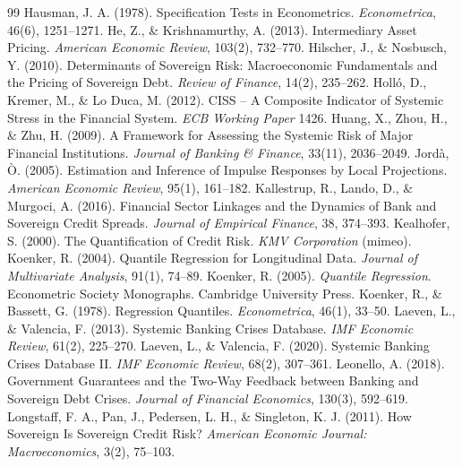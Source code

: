 \begin{thebibliography}{99}
 Hausman, J. A. (1978). Specification Tests in Econometrics. \textit{Econometrica}, 46(6), 1251--1271.
 He, Z., \& Krishnamurthy, A. (2013). Intermediary Asset Pricing. \textit{American Economic Review}, 103(2), 732--770.
 Hilscher, J., \& Nosbusch, Y. (2010). Determinants of Sovereign Risk: Macroeconomic Fundamentals and the Pricing of Sovereign Debt. \textit{Review of Finance}, 14(2), 235--262.
 Holló, D., Kremer, M., \& Lo Duca, M. (2012). CISS -- A Composite Indicator of Systemic Stress in the Financial System. \textit{ECB Working Paper} 1426.
 Huang, X., Zhou, H., \& Zhu, H. (2009). A Framework for Assessing the Systemic Risk of Major Financial Institutions. \textit{Journal of Banking \& Finance}, 33(11), 2036--2049.
 Jordà, Ò. (2005). Estimation and Inference of Impulse Responses by Local Projections. \textit{American Economic Review}, 95(1), 161--182.
 Kallestrup, R., Lando, D., \& Murgoci, A. (2016). Financial Sector Linkages and the Dynamics of Bank and Sovereign Credit Spreads. \textit{Journal of Empirical Finance}, 38, 374--393.
 Kealhofer, S. (2000). The Quantification of Credit Risk. \textit{KMV Corporation} (mimeo).
 Koenker, R. (2004). Quantile Regression for Longitudinal Data. \textit{Journal of Multivariate Analysis}, 91(1), 74--89.
 Koenker, R. (2005). \textit{Quantile Regression}. Econometric Society Monographs. Cambridge University Press.
 Koenker, R., \& Bassett, G. (1978). Regression Quantiles. \textit{Econometrica}, 46(1), 33--50.
 Laeven, L., \& Valencia, F. (2013). Systemic Banking Crises Database. \textit{IMF Economic Review}, 61(2), 225--270.
 Laeven, L., \& Valencia, F. (2020). Systemic Banking Crises Database II. \textit{IMF Economic Review}, 68(2), 307--361.
 Leonello, A. (2018). Government Guarantees and the Two-Way Feedback between Banking and Sovereign Debt Crises. \textit{Journal of Financial Economics}, 130(3), 592--619.
 Longstaff, F. A., Pan, J., Pedersen, L. H., \& Singleton, K. J. (2011). How Sovereign Is Sovereign Credit Risk? \textit{American Economic Journal: Macroeconomics}, 3(2), 75--103.

\end{thebibliography}
